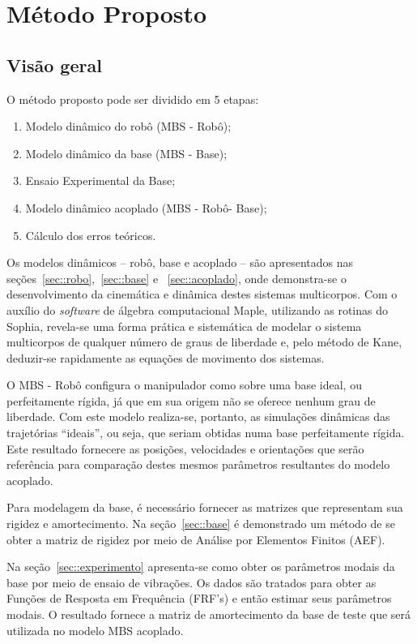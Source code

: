 \chapter{Método Proposto}



\section{Visão geral}

O método proposto pode ser dividido em 5 etapas:
%
\begin{enumerate}
  \item Modelo dinâmico do robô (MBS - Robô);
  \item Modelo dinâmico da base (MBS - Base);
  \item Ensaio Experimental da Base;
  \item Modelo dinâmico acoplado (MBS - Robô- Base);
  \item Cálculo dos erros teóricos.
\end{enumerate}

Os modelos dinâmicos -- robô, base e  acoplado -- são apresentados nas
seções~\ref{sec::robo},~\ref{sec::base} e ~\ref{sec::acoplado}, onde
demonstra-se o desenvolvimento da cinemática e dinâmica destes sistemas
multicorpos.
Com o auxílio do \textit{software} de álgebra computacional Maple, utilizando as
rotinas do Sophia, revela-se uma forma prática e sistemática de modelar o
sistema multicorpos de qualquer número de graus de liberdade e, pelo método de
Kane, deduzir-se rapidamente as equações de movimento dos sistemas.

O MBS - Robô configura o manipulador como sobre uma base ideal, ou perfeitamente
rígida, já que em sua origem não se oferece nenhum grau de liberdade. Com este
modelo realiza-se, portanto, as simulações dinâmicas das trajetórias ``ideais'',
ou seja, que seriam obtidas numa base perfeitamente rígida. Este resultado
fornecere as posições, velocidades e orientações que serão referência para
comparação destes mesmos parâmetros resultantes do modelo acoplado.

Para modelagem da base, é necessário fornecer as matrizes que representam sua
rigidez e amortecimento. Na seção~\ref{sec::base} é demonstrado um método de se
obter a matriz de rigidez por meio de Análise por Elementos Finitos (AEF).

Na seção~\ref{sec::experimento} apresenta-se como obter os parâmetros modais da
base por meio de ensaio de vibrações. Os dados são tratados para obter as
Funções de Resposta em Frequência (FRF's) e então estimar seus parâmetros
modais. O resultado fornece a matriz de amortecimento da base de teste que será
utilizada no modelo MBS acoplado.

